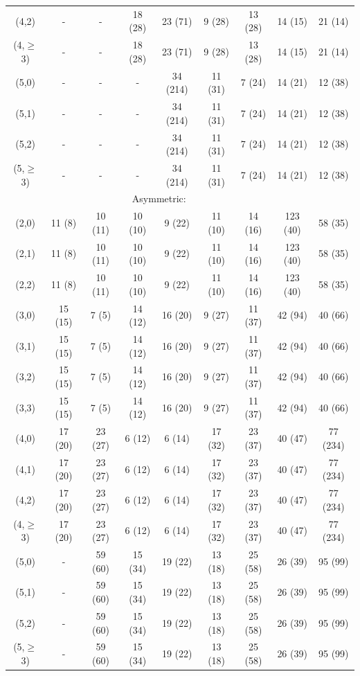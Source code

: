\begin{table}[h!]
\begin{tabular}{ ccccccccc }
    (4,2)       & - & - & 18 (28) & 23 (71) & 9 (28) & 13 (28) & 14 (15) & 21 (14)\\
    (4,$\geq$3)       & - & - & 18 (28) & 23 (71) & 9 (28) & 13 (28) & 14 (15) & 21 (14)\\
    (5,0)       &- & - & - & 34 (214) & 11 (31) & 7 (24) & 14 (21) & 12 (38)   \\
    (5,1)       &- & - & - & 34 (214) & 11 (31) & 7 (24) & 14 (21) & 12 (38)   \\
    (5,2)       &- & - & - & 34 (214) & 11 (31) & 7 (24) & 14 (21) & 12 (38)   \\
    (5,$\geq$3)       &- & - & - & 34 (214) & 11 (31) & 7 (24) & 14 (21) & 12 (38)   \\
    \hline
    \multicolumn{8}{c}{Asymmetric:}                                                                \\
    (2,0)       &11 (8) & 10 (11) & 10 (10) & 9 (22) & 11 (10) & 14 (16) & 123 (40) & 58 (35) \\
    (2,1)       &11 (8) & 10 (11) & 10 (10) & 9 (22) & 11 (10) & 14 (16) & 123 (40) & 58 (35) \\
    (2,2)       &11 (8) & 10 (11) & 10 (10) & 9 (22) & 11 (10) & 14 (16) & 123 (40) & 58 (35) \\
    (3,0)       & 15 (15) & 7 (5) & 14 (12) & 16 (20) & 9 (27) & 11 (37) & 42 (94) & 40 (66) \\
    (3,1)       & 15 (15) & 7 (5) & 14 (12) & 16 (20) & 9 (27) & 11 (37) & 42 (94) & 40 (66) \\
    (3,2)       & 15 (15) & 7 (5) & 14 (12) & 16 (20) & 9 (27) & 11 (37) & 42 (94) & 40 (66) \\
    (3,3)       & 15 (15) & 7 (5) & 14 (12) & 16 (20) & 9 (27) & 11 (37) & 42 (94) & 40 (66) \\
    (4,0)       & 17 (20) & 23 (27) & 6 (12) & 6 (14) & 17 (32) & 23 (37) & 40 (47) & 77 (234) \\
    (4,1)       & 17 (20) & 23 (27) & 6 (12) & 6 (14) & 17 (32) & 23 (37) & 40 (47) & 77 (234) \\
    (4,2)       & 17 (20) & 23 (27) & 6 (12) & 6 (14) & 17 (32) & 23 (37) & 40 (47) & 77 (234) \\
    (4,$\geq$3)       & 17 (20) & 23 (27) & 6 (12) & 6 (14) & 17 (32) & 23 (37) & 40 (47) & 77 (234) \\
    (5,0)       &- & 59 (60) & 15 (34) & 19 (22) & 13 (18) & 25 (58) & 26 (39) & 95 (99)\\
    (5,1)       &- & 59 (60) & 15 (34) & 19 (22) & 13 (18) & 25 (58) & 26 (39) & 95 (99)\\
    (5,2)       &- & 59 (60) & 15 (34) & 19 (22) & 13 (18) & 25 (58) & 26 (39) & 95 (99)\\
    (5,$\geq$3)       &- & 59 (60) & 15 (34) & 19 (22) & 13 (18) & 25 (58) & 26 (39) & 95 (99)\\
    \hline
    \hline
  \end{tabular}
\end{table}

